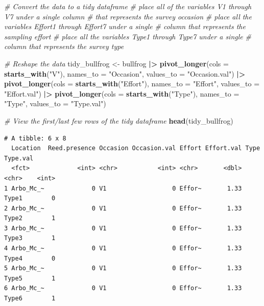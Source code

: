 \documentclass[
  10t,
]{article}
\newenvironment{Shaded}{\begin{snugshade}}{\end{snugshade}}
\newcommand{\AttributeTok}[1]{\textcolor[rgb]{0.13,0.29,0.53}{#1}}
\newcommand{\CommentTok}[1]{\textcolor[rgb]{0.56,0.35,0.01}{\textit{#1}}}
\newcommand{\FunctionTok}[1]{\textcolor[rgb]{0.13,0.29,0.53}{\textbf{#1}}}
\newcommand{\NormalTok}[1]{#1}
\newcommand{\OtherTok}[1]{\textcolor[rgb]{0.56,0.35,0.01}{#1}}
\newcommand{\SpecialCharTok}[1]{\textcolor[rgb]{0.81,0.36,0.00}{\textbf{#1}}}
\newcommand{\StringTok}[1]{\textcolor[rgb]{0.31,0.60,0.02}{#1}}
\begin{document}
\begin{Shaded}
\begin{Highlighting}[]
\CommentTok{\# Convert the data to a tidy dataframe}
\CommentTok{\# place all of the variables \textasciigrave{}V1\textasciigrave{} through \textasciigrave{}V7\textasciigrave{} under a single column}
\CommentTok{\# that represents the survey occasion}
\CommentTok{\# place all the variables \textasciigrave{}Effort1\textasciigrave{} through \textasciigrave{}Effort7\textasciigrave{} under a single}
\CommentTok{\# column that represents the sampling effort}
\CommentTok{\# place all the variables \textasciigrave{}Type1\textasciigrave{} through \textasciigrave{}Type7\textasciigrave{} under a single}
\CommentTok{\# column that represents the survey type}

\CommentTok{\# Reshape the data}
\NormalTok{tidy\_bullfrog }\OtherTok{\textless{}{-}}\NormalTok{ bullfrog }\SpecialCharTok{|\textgreater{}} 
  \FunctionTok{pivot\_longer}\NormalTok{(}\AttributeTok{cols =} \FunctionTok{starts\_with}\NormalTok{(}\StringTok{"V"}\NormalTok{),}
               \AttributeTok{names\_to =} \StringTok{"Occasion"}\NormalTok{,}
               \AttributeTok{values\_to =} \StringTok{"Occasion.val"}\NormalTok{) }\SpecialCharTok{|\textgreater{}} 
  \FunctionTok{pivot\_longer}\NormalTok{(}\AttributeTok{cols =} \FunctionTok{starts\_with}\NormalTok{(}\StringTok{"Effort"}\NormalTok{),}
               \AttributeTok{names\_to =} \StringTok{"Effort"}\NormalTok{,}
               \AttributeTok{values\_to =} \StringTok{"Effort.val"}\NormalTok{) }\SpecialCharTok{|\textgreater{}} 
  \FunctionTok{pivot\_longer}\NormalTok{(}\AttributeTok{cols =} \FunctionTok{starts\_with}\NormalTok{(}\StringTok{"Type"}\NormalTok{),}
               \AttributeTok{names\_to =} \StringTok{"Type"}\NormalTok{,}
               \AttributeTok{values\_to =} \StringTok{"Type.val"}\NormalTok{)}

\CommentTok{\# View the first/last few rows of the tidy dataframe}
\FunctionTok{head}\NormalTok{(tidy\_bullfrog)}
\end{Highlighting}
\end{Shaded}

\begin{verbatim}
# A tibble: 6 x 8
  Location  Reed.presence Occasion Occasion.val Effort Effort.val Type  Type.val
  <fct>             <int> <chr>           <int> <chr>       <dbl> <chr>    <int>
1 Arbo_Mc_~             0 V1                  0 Effor~       1.33 Type1        0
2 Arbo_Mc_~             0 V1                  0 Effor~       1.33 Type2        1
3 Arbo_Mc_~             0 V1                  0 Effor~       1.33 Type3        1
4 Arbo_Mc_~             0 V1                  0 Effor~       1.33 Type4        0
5 Arbo_Mc_~             0 V1                  0 Effor~       1.33 Type5        1
6 Arbo_Mc_~             0 V1                  0 Effor~       1.33 Type6        1
\end{verbatim}
\end{document}
